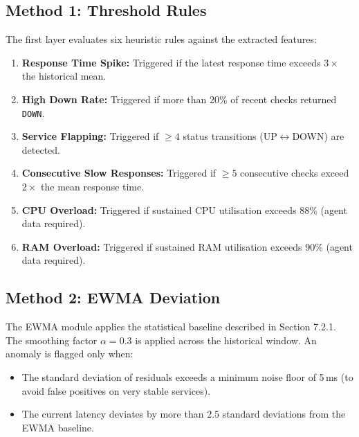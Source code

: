 \documentclass[12pt,a4paper,oneside]{report}
\begin{document}
\subsection{Method 1: Threshold Rules}
\noindent The first layer evaluates six heuristic rules against the extracted features:
\begin{enumerate}
    \item \textbf{Response Time Spike:} Triggered if the latest response time exceeds $3\times$ the historical mean.
    \item \textbf{High Down Rate:} Triggered if more than 20\% of recent checks returned \texttt{DOWN}.
    \item \textbf{Service Flapping:} Triggered if $\geq 4$ status transitions (UP$\leftrightarrow$DOWN) are detected.
    \item \textbf{Consecutive Slow Responses:} Triggered if $\geq 5$ consecutive checks exceed $2\times$ the mean response time.
    \item \textbf{CPU Overload:} Triggered if sustained CPU utilisation exceeds 88\% (agent data required).
    \item \textbf{RAM Overload:} Triggered if sustained RAM utilisation exceeds 90\% (agent data required).
\end{enumerate}

\subsection{Method 2: EWMA Deviation}
\noindent The EWMA module applies the statistical baseline described in Section 7.2.1. The smoothing factor $\alpha = 0.3$ is applied across the historical window. An anomaly is flagged only when:
\begin{itemize}[label=\textbullet, leftmargin=*]
    \item The standard deviation of residuals exceeds a minimum noise floor of 5\,ms (to avoid false positives on very stable services).
    \item The current latency deviates by more than $2.5$ standard deviations from the EWMA baseline.
\end{itemize}
\end{document}
